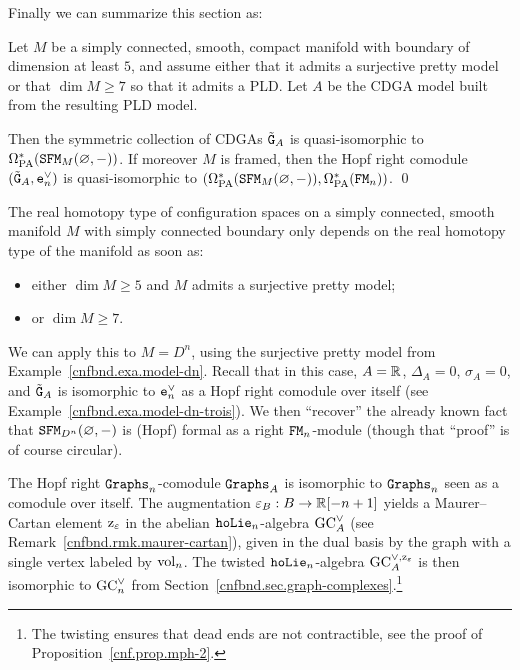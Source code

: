 Finally we can summarize this section as:
\begin{theorem}
  \label{cnfbnd.thm.model-ga}
  Let $M$ be a simply connected, smooth, compact manifold with boundary of dimension at least $5$, and assume either that it admits a surjective pretty model or that $\dim M \geq 7$ so that it admits a PLD.
  Let $A$ be the CDGA model built from the resulting PLD model.

  Then the symmetric collection of CDGAs $\tilde{\mathtt{G}}_{A}$ is quasi-isomorphic to $\Omega_{\mathrm{PA}}^{*}(\mathtt{SFM}_{M}(\varnothing,-))$.
  If moreover $M$ is framed, then the Hopf right comodule $(\tilde{\mathtt{G}}_{A}, \mathtt{e}_{n}^{\vee})$ is quasi-isomorphic to $(\Omega_{\mathrm{PA}}^{*}(\mathtt{SFM}_{M}(\varnothing, -)), \Omega_{\mathrm{PA}}^{*}(\mathtt{FM}_{n}))$.
  \qed
\end{theorem}

\begin{corollary}
  The real homotopy type of configuration spaces on a simply connected, smooth manifold $M$ with simply connected boundary only depends on the real homotopy type of the manifold as soon as:
  \begin{itemize}
  \item either $\dim M \geq 5$ and $M$ admits a surjective pretty model;
  \item or $\dim M \geq 7$.
  \end{itemize}
\end{corollary}

\begin{example}
  We can apply this to $M = D^{n}$, using the surjective pretty model from Example~\ref{cnfbnd.exa.model-dn}.
  Recall that in this case, $A = \mathbb{R}$, $\Delta_{A} = 0$, $\sigma_{A} = 0$, and $\tilde{\mathtt{G}}_{A}$ is isomorphic to $\mathtt{e}_{n}^{\vee}$ as a Hopf right comodule over itself (see Example~\ref{cnfbnd.exa.model-dn-trois}).
  We then ``recover'' the already known fact that $\mathtt{SFM}_{D^{n}}(\varnothing,-)$ is (Hopf) formal as a right $\mathtt{FM}_{n}$-module (though that ``proof'' is of course circular).

  The Hopf right $\mathtt{Graphs}_{n}$-comodule $\mathtt{Graphs}_{A}$ is isomorphic to $\mathtt{Graphs}_{n}$ seen as a comodule over itself.
  The augmentation $\varepsilon_{B} : B \to \mathbb{R}[-n+1]$ yields a Maurer--Cartan element $\mathrm{z}_{\varepsilon}$ in the abelian $\mathtt{hoLie}_{n}$-algebra $\mathrm{GC}_{A}^{\vee}$ (see Remark~\ref{cnfbnd.rmk.maurer-cartan}), given in the dual basis by the graph with a single vertex labeled by $\mathrm{vol}_{n}$.
  The twisted $\mathtt{hoLie}_{n}$-algebra $\mathrm{GC}_{A}^{\vee,\mathrm{z}_{\varepsilon}}$ is then isomorphic to $\mathrm{GC}^{\vee}_{n}$ from Section~\ref{cnfbnd.sec.graph-complexes}.\footnote{The twisting ensures that dead ends are not contractible, see the proof of Proposition~\ref{cnf.prop.mph-2}.}
\end{example}

